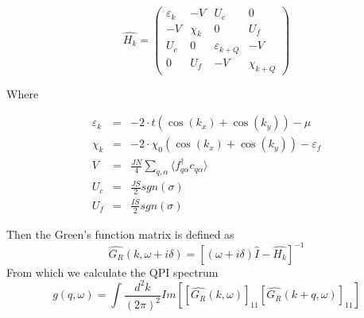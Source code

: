 \documentclass[11pt, oneside]{article}
\begin{document}
$$ \hat{H_k} = 
\left( \begin{array}{cccc}
\varepsilon _{k} & -V & U_{c} & 0 \\
-V & \chi _{k} & 0 & U_{f} \\
U_{c} & 0 & \varepsilon _{k+Q} & -V \\
0 & U_{f} & -V & \chi _{k+Q}
\end{array}\right) $$

Where

\begin{eqnarray*}
\varepsilon_k &=& -2 \cdot t (\cos(k_x) + \cos(k_y)) - \mu \\
\chi_k &=& -2 \cdot \chi_0 (\cos(k_x) + \cos(k_y)) - \varepsilon_f \\
V &=& \frac{J N}{4} \sum_{q,\alpha} \langle f_{q\alpha}^\dagger c_{q\alpha} \rangle \\
U_c &=& \frac{J S}{2} sgn(\sigma) \\
U_f &=& \frac{I S}{2} sgn(\sigma)
\end{eqnarray*}

Then the Green's function matrix is defined as
$$ \hat{G_R}(k,\omega+i\delta) = [(\omega+i\delta)\hat{I} - \hat{H_k}]^{-1} $$
From which we calculate the QPI spectrum
$$ g(q,\omega)=\int \frac{d^2k}{(2 \pi)^2}Im[ [\hat{G_R}(k,\omega)]_{11}[\hat{G_R}(k+q,\omega)]_{11}] $$
\end{document}
